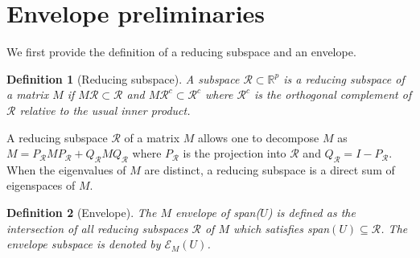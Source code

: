 \documentclass{article}\usepackage[]{graphicx}\usepackage[]{color}
\newcommand{\R}{\mathbb{R}}
\newcommand{\calR}{\mathcal{R}}
\newcommand{\E}{\mathcal{E}}
\newtheorem{defn}{Definition}
\begin{document}
\section{Envelope preliminaries}

We first provide the definition of a reducing subspace and an envelope. 

\begin{defn}[Reducing subspace]
A subspace $\calR \subset \R^p$ is a reducing subspace of a matrix $M$ if $M\calR \subset \calR$ and $M\calR^{c} \subset \calR^{c}$ where $\calR^{c}$ is the orthogonal complement of $\calR$ relative to the usual inner product. 
\end{defn}

A reducing subspace $\calR$ of a matrix $M$ allows one to decompose $M$ as $M = P_{\calR}MP_{\calR} + Q_{\calR}MQ_{\calR}$ where $P_{\calR}$ is the projection into $\calR$ and $Q_{\calR} = I - P_{\calR}$. When the eigenvalues of $M$ are distinct, a reducing subspace is a direct sum of eigenspaces of $M$. 

\begin{defn}[Envelope]
The $M$ envelope of span($U$) is defined as the intersection of all reducing subspaces $\calR$ of $M$ which satisfies span$(U) \subseteq \calR$. The envelope subspace is denoted by $\E_M(U)$. 
\end{defn}
\end{document}
